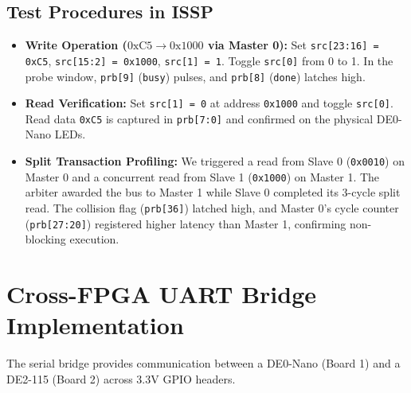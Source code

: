 \documentclass[11pt,a4paper]{article}
\begin{document}
\subsection{Test Procedures in ISSP}
\begin{itemize}
    \item \textbf{Write Operation ($0\text{xC5} \to 0\text{x1000}$ via Master 0):} Set \texttt{src[23:16] = 0xC5}, \texttt{src[15:2] = 0x1000}, \texttt{src[1] = 1}. Toggle \texttt{src[0]} from 0 to 1. In the probe window, \texttt{prb[9]} (\texttt{busy}) pulses, and \texttt{prb[8]} (\texttt{done}) latches high.
    \item \textbf{Read Verification:} Set \texttt{src[1] = 0} at address \texttt{0x1000} and toggle \texttt{src[0]}. Read data \texttt{0xC5} is captured in \texttt{prb[7:0]} and confirmed on the physical DE0-Nano LEDs.
    \item \textbf{Split Transaction Profiling:} We triggered a read from Slave 0 (\texttt{0x0010}) on Master 0 and a concurrent read from Slave 1 (\texttt{0x1000}) on Master 1. The arbiter awarded the bus to Master 1 while Slave 0 completed its 3-cycle split read. The collision flag (\texttt{prb[36]}) latched high, and Master 0's cycle counter (\texttt{prb[27:20]}) registered higher latency than Master 1, confirming non-blocking execution.
\end{itemize}

\section{Cross-FPGA UART Bridge Implementation}

The serial bridge provides communication between a DE0-Nano (Board 1) and a DE2-115 (Board 2) across 3.3V GPIO headers.
\end{document}
